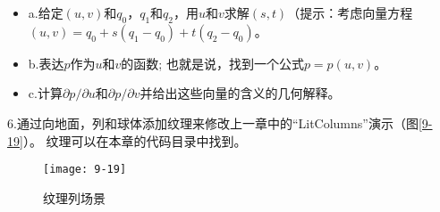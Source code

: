 \begin{itemize}
  \item a.给定$(u,v)$和$q_{0}$，$q_{1}$和$q_{2}$，用$u$和$v$求解$(s,t)$（提示：考虑向量方程$(u,v)=q_{0}+s(q_{1}-q_{0})+t(q_{2}-q_{0})$。
  \item b.表达$p$作为$u$和$v$的函数; 也就是说，找到一个公式$p=p(u,v)$。
  \item c.计算$\partial p/\partial u$和$\partial p/\partial v$并给出这些向量的含义的几何解释。
\end{itemize}

\begin{flushleft}
6.通过向地面，列和球体添加纹理来修改上一章中的“LitColumns”演示（图\ref{9-19}）。 纹理可以在本章的代码目录中找到。
\end{flushleft}

\begin{figure}[h]
    \label{fig:9-19}
    \texttt{[image: 9-19]}
    \centering
    \caption{纹理列场景}
\end{figure}
